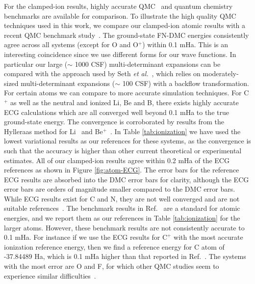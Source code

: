 \documentclass[pra,superscriptaddress,groupedaddress,twocolumn]{revtex4-1}
\begin{document}
For the clamped-ion results, highly accurate QMC~\cite{Brown_Bench,Toulouse_Bench,Seth_Bench,Morale_Bench,Rappe_Bench} and quantum chemistry benchmarks are available for comparison. To illustrate the high quality QMC techniques used in this work, we compare our clamped-ion atomic results with a recent QMC benchmark study~\cite{Seth_Bench}. The ground-state FN-DMC energies consistently agree across all systems (except for O and O$^{+}$) within 0.1 mHa. This is an interesting coincidence since we use different forms for our wave functions. In particular our large ($\sim$ 1000 CSF) multi-determinant expansions can be compared with the approach used by Seth {\it et al.}~\cite{Seth_Bench}, which relies on moderately-sized multi-determinant expansions ($\sim$ 100 CSF) with a backflow transformation. For certain atoms we can compare to more accurate simulation techniques. For C$^+$ as well as the neutral and ionized Li, Be and B, there exists highly accurate ECG calculations which are all converged well beyond 0.1 mHa to the true ground-state energy. The convergence is corroborated by results from the Hylleraas method for Li~\cite{Wang_Li} and Be$^+$~\cite{Puchalski_Be+}. In Table \ref{tab:ionization} we have used the lowest variational results as our references for these systems, as the convergence is such that the accuracy is higher than other current theoretical or experimental estimates. All of our clamped-ion results agree within 0.2 mHa of the ECG references as shown in Figure \ref{fig:atom-ECG}. The error bars for the reference ECG results are absorbed into the DMC error bars for clarity, although the ECG error bars are orders of magnitude smaller compared to the DMC error bars. While ECG results exist for C and N, they are not well converged and are not suitable references~\cite{Bubin_C,Sharkey_N}. The benchmark results in Ref.~\cite{Davidson_Atoms} are a standard for atomic energies, and we report them as our references in Table \ref{tab:ionization} for the larger atoms. However, these benchmark results are not consistently accurate to 0.1 mHa. For instance if we use the ECG results for $\text{C}^+$ with the most accurate ionization reference energy, then we find a reference energy for C atom of -37.84489 Ha, which is 0.1 mHa higher than that reported in Ref.~\cite{Davidson_Atoms}. %
The systems with the most error are O and F, for which other QMC studies seem to experience similar difficulties~\cite{Seth_Bench,Booth_FCIQMC,Brown_Bench,Shiwei_AFQMC}.
\end{document}

